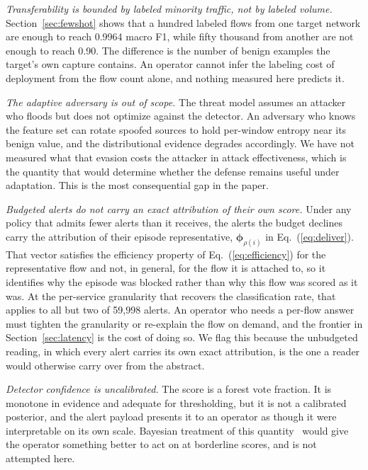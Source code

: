 \documentclass{ieeeaccess}
\begin{document}
\emph{Transferability is bounded by labeled minority traffic, not by labeled volume.} Section~\ref{sec:fewshot} shows that a hundred labeled flows from one target network are enough to reach 0.9964 macro F1, while fifty thousand from another are not enough to reach 0.90. The difference is the number of benign examples the target's own capture contains. An operator cannot infer the labeling cost of deployment from the flow count alone, and nothing measured here predicts it.

\emph{The adaptive adversary is out of scope.} The threat model assumes an attacker who floods but does not optimize against the detector. An adversary who knows the feature set can rotate spoofed sources to hold per-window entropy near its benign value, and the distributional evidence degrades accordingly. We have not measured what that evasion costs the attacker in attack effectiveness, which is the quantity that would determine whether the defense remains useful under adaptation. This is the most consequential gap in the paper.

\emph{Budgeted alerts do not carry an exact attribution of their own score.} Under any policy that admits fewer alerts than it receives, the alerts the budget declines carry the attribution of their episode representative, $\boldsymbol{\phi}_{\rho(i)}$ in Eq.~(\ref{eq:deliver}). That vector satisfies the efficiency property of Eq.~(\ref{eq:efficiency}) for the representative flow and not, in general, for the flow it is attached to, so it identifies why the episode was blocked rather than why this flow was scored as it was. At the per-service granularity that recovers the classification rate, that applies to all but two of 59,998 alerts. An operator who needs a per-flow answer must tighten the granularity or re-explain the flow on demand, and the frontier in Section~\ref{sec:latency} is the cost of doing so. We flag this because the unbudgeted reading, in which every alert carries its own exact attribution, is the one a reader would otherwise carry over from the abstract.

\emph{Detector confidence is uncalibrated.} The score is a forest vote fraction. It is monotone in evidence and adequate for thresholding, but it is not a calibrated posterior, and the alert payload presents it to an operator as though it were interpretable on its own scale. Bayesian treatment of this quantity~\cite{swaminathan2022bayesian} would give the operator something better to act on at borderline scores, and is not attempted here.
\end{document}
